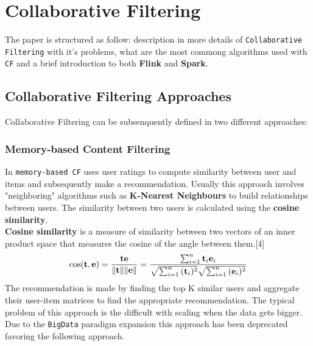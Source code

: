\documentclass{sig-alternate-05-2015}
\begin{document}
\section{Collaborative Filtering}

The paper is structured as follow: description in more details
of \texttt{Collaborative Filtering} with it's problems, what are
the most commong algorithms used with \texttt{CF} and a brief
introduction to both \textbf{Flink} and \textbf{Spark}.



\subsection{Collaborative Filtering Approaches}


Collaborative Filtering can be subsenquently defined in two
different approaches:

\subsubsection{Memory-based Content Filtering}
In \texttt{memory-based CF} uses user ratings to compute similarity
between user and items and subsequently make a recommendation. Usually
this approach involves "neighboring" algorithms such as \textbf{K-Nearest Neighbours}
to build relationships between users. The similarity between two users
is calculated using the \textbf{cosine similarity}.\\
\textbf{Cosine similarity} is a measure of similarity between two vectors of an inner product space that measures the cosine of the angle between them.[4]
\begin{equation}
\cos ({\bf t},{\bf e})= {{\bf t} {\bf e} \over \|{\bf t}\| \|{\bf e}\|} = \frac{ \sum_{i=1}^{n}{{\bf t}_i{\bf e}_i} }{ \sqrt{\sum_{i=1}^{n}{({\bf t}_i)^2}} \sqrt{\sum_{i=1}^{n}{({\bf e}_i)^2}} }
\end{equation}
The recommendation is made by finding the top K similar users and aggregate their
user-item matrices to find the appropriate recommendation.
The typical problem of this approach is the difficult with scaling
when the data gets bigger. Due to the \texttt{BigData} paradigm expansion
this approach has been deprecated favoring the following approach.
\end{document}
